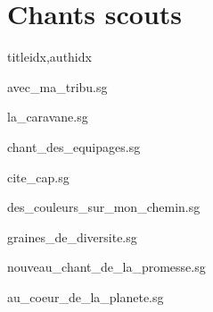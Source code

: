 \documentclass[
    ]{article}
\begin{document}
\section{Chants scouts}

\begin{songs}{titleidx,authidx}

{avec_ma_tribu.sg}


{la_caravane.sg}


{chant_des_equipages.sg}


{cite_cap.sg}


{des_couleurs_sur_mon_chemin.sg}


{graines_de_diversite.sg}


{nouveau_chant_de_la_promesse.sg}


{au_coeur_de_la_planete.sg}


\end{songs}
\end{document}
